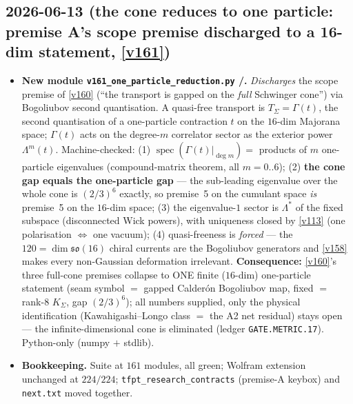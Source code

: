 \subsection*{2026-06-13 (the cone reduces to one particle: premise A's scope premise discharged to a 16-dim statement, \vref{v161})}
\begin{itemize}
\item \textbf{New module \texttt{v161\_one\_particle\_reduction.py} \mE/\mO.} \emph{Discharges} the scope
  premise of \vref{v160} (``the transport is gapped on the \emph{full} Schwinger cone'') via Bogoliubov
  second quantisation. A quasi-free transport is $T_\Sigma{=}\Gamma(t)$, the second quantisation of a
  one-particle contraction $t$ on the $16$-dim Majorana space; $\Gamma(t)$ acts on the degree-$m$ correlator
  sector as the exterior power $\Lambda^m(t)$. Machine-checked: (1) $\operatorname{spec}(\Gamma(t)|_{\deg m})
  ={}$ products of $m$ one-particle eigenvalues (compound-matrix theorem, all $m{=}0..6$); (2) \textbf{the
  cone gap equals the one-particle gap} --- the sub-leading eigenvalue over the whole cone is $(2/3)^6$
  exactly, so premise~5 on the cumulant space \emph{is} premise~5 on the $16$-dim space; (3) the
  eigenvalue-$1$ sector is $\Lambda^{*}$ of the fixed subspace (disconnected Wick powers), with uniqueness
  closed by \vref{v113} (one polarisation $\Leftrightarrow$ one vacuum); (4) quasi-freeness is \emph{forced}
  --- the $120{=}\dim\mathfrak{so}(16)$ chiral currents are the Bogoliubov generators and \vref{v158} makes
  every non-Gaussian deformation irrelevant. \textbf{Consequence:} \vref{v160}'s three full-cone premises
  collapse to ONE finite ($16$-dim) one-particle statement (seam symbol $=$ gapped Calder\'on Bogoliubov
  map, fixed $=$ rank-$8$ $K_\Sigma$, gap $(2/3)^6$); all numbers supplied, only the physical identification
  (Kawahigashi--Longo class $=$ the A2 net residual) stays open --- the infinite-dimensional cone is
  eliminated (ledger \texttt{GATE.METRIC.17}). Python-only (numpy $+$ stdlib).
\item \textbf{Bookkeeping.} Suite at $161$ modules, all green; Wolfram extension unchanged at $224/224$;
  \texttt{tfpt\_research\_contracts} (premise-A keybox) and \texttt{next.txt} moved together.
\end{itemize}

